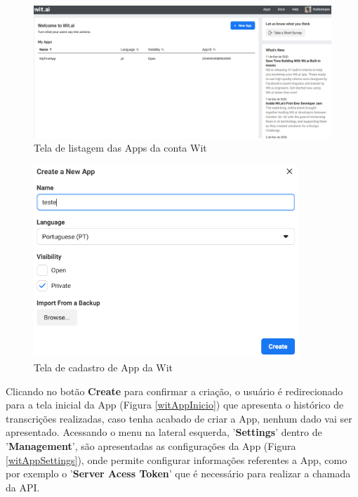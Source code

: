\begin{figure}[h!]
\centering
\caption{Tela de listagem das Apps da conta Wit}
\label{witListagemApps}
\includegraphics[width=150mm]{images/ConfigurarWit/witListagemApp.PNG}
\end{figure}

\begin{figure}[h!]
\centering
\caption{Tela de cadastro de App da Wit}
\label{witCreateApp}
\includegraphics[width=100mm]{images/ConfigurarWit/witCreateApp.PNG}
\end{figure}

\FloatBarrier
Clicando no botão \textbf{Create} para confirmar a criação, o usuário é  redirecionado  para a tela inicial da App (Figura \ref{witAppInicio}) que apresenta o histórico de transcrições realizadas, caso tenha acabado de criar a App, nenhum dado vai ser apresentado. Acessando o menu na lateral esquerda, '\textbf{Settings}' dentro de '\textbf{Management}', são apresentadas as configurações da App (Figura \ref{witAppSettings}), onde permite configurar informações referentes a App, como por exemplo o '\textbf{Server Acess Token}' que é necessário para realizar a chamada da API.



